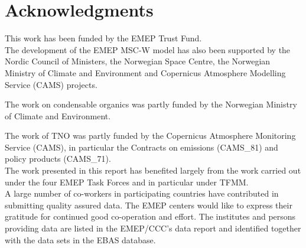 \chapter*{Acknowledgments}

\enlargethispage{3\baselineskip}

\vspace{-2cm}


This work has been funded by the EMEP Trust Fund.\\

The development of the EMEP MSC-W model has also been supported by the Nordic Council of Ministers, the Norwegian Space Centre, the Norwegian Ministry of Climate and Environment and Copernicus Atmosphere Modelling Service (CAMS) projects.


The work on condensable organics was partly funded by the Norwegian Ministry of Climate and Environment. 


The work of TNO was partly funded
by the Copernicus Atmosphere Monitoring Service (CAMS),
in particular the Contracts on emissions (CAMS\_81) and policy products
(CAMS\_71).\\

The work presented in this report has benefited largely from the work carried out under the four EMEP Task Forces and in particular under TFMM.\\

A large number of co-workers in participating countries have contributed in submitting quality assured data. The EMEP centers would like to express their gratitude for continued good co-operation and effort. The institutes and persons providing data are listed in the EMEP/CCC's data report and identified together with the data sets in the EBAS database.

